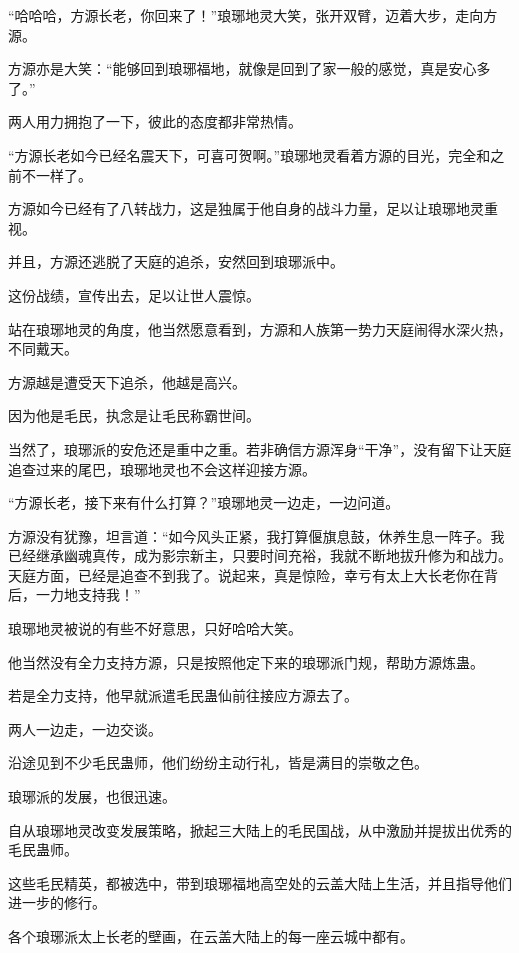 
\begin{this_body}

“哈哈哈，方源长老，你回来了！”琅琊地灵大笑，张开双臂，迈着大步，走向方源。

方源亦是大笑：“能够回到琅琊福地，就像是回到了家一般的感觉，真是安心多了。”

两人用力拥抱了一下，彼此的态度都非常热情。

“方源长老如今已经名震天下，可喜可贺啊。”琅琊地灵看着方源的目光，完全和之前不一样了。

方源如今已经有了八转战力，这是独属于他自身的战斗力量，足以让琅琊地灵重视。

并且，方源还逃脱了天庭的追杀，安然回到琅琊派中。

这份战绩，宣传出去，足以让世人震惊。

站在琅琊地灵的角度，他当然愿意看到，方源和人族第一势力天庭闹得水深火热，不同戴天。

方源越是遭受天下追杀，他越是高兴。

因为他是毛民，执念是让毛民称霸世间。

当然了，琅琊派的安危还是重中之重。若非确信方源浑身“干净”，没有留下让天庭追查过来的尾巴，琅琊地灵也不会这样迎接方源。

“方源长老，接下来有什么打算？”琅琊地灵一边走，一边问道。

方源没有犹豫，坦言道：“如今风头正紧，我打算偃旗息鼓，休养生息一阵子。我已经继承幽魂真传，成为影宗新主，只要时间充裕，我就不断地拔升修为和战力。天庭方面，已经是追查不到我了。说起来，真是惊险，幸亏有太上大长老你在背后，一力地支持我！”

琅琊地灵被说的有些不好意思，只好哈哈大笑。

他当然没有全力支持方源，只是按照他定下来的琅琊派门规，帮助方源炼蛊。

若是全力支持，他早就派遣毛民蛊仙前往接应方源去了。

两人一边走，一边交谈。

沿途见到不少毛民蛊师，他们纷纷主动行礼，皆是满目的崇敬之色。

琅琊派的发展，也很迅速。

自从琅琊地灵改变发展策略，掀起三大陆上的毛民国战，从中激励并提拔出优秀的毛民蛊师。

这些毛民精英，都被选中，带到琅琊福地高空处的云盖大陆上生活，并且指导他们进一步的修行。

各个琅琊派太上长老的壁画，在云盖大陆上的每一座云城中都有。


\end{this_body}

